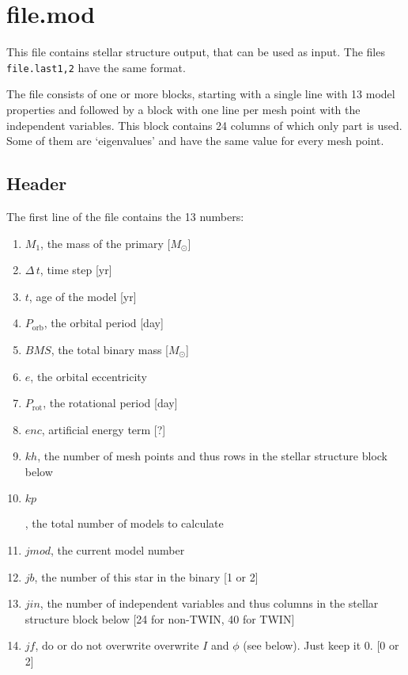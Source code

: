 \section{file.mod}
\label{sec:mod}

This file contains stellar structure output, that can be used as input.
The files \texttt{file.last1,2} have the same format.

The file consists of one or more blocks, starting with a single line with 13 model properties
and followed by a block with one line per mesh point with the independent variables.  This
block contains 24 columns of which only part is used.  Some of them are `eigenvalues' and
have the same value for every mesh point.


\subsection{Header}
The first line of the file contains the 13 numbers:
\begin{enumerate}
\item $M_1$, the mass of the primary [$M_\odot$]
\item $\Delta\,t$, time step [yr]
\item $t$, age of the model [yr]
\item $P_\mathrm{orb}$, the orbital period [day]
\item $BMS$, the total binary mass [$M_\odot$]
\item $e$, the orbital eccentricity
\item $P_\mathrm{rot}$, the rotational period [day]
\item $enc$, artificial energy term [?]
\item $kh$, the number of mesh points and thus rows in the stellar structure block below 
\item \hypertarget{kp}{$kp$}, the total number of models to calculate
\item $jmod$, the current model number
\item $jb$, the number of this star in the binary [1 or 2]
\item $jin$, the number of independent variables and thus columns in the stellar structure block below [24 for non-TWIN, 40 for TWIN]
\item $jf$, do or do not overwrite overwrite $I$ and $\phi$ (see below). Just keep it 0. [0 or 2]
\end{enumerate}

\pagebreak
